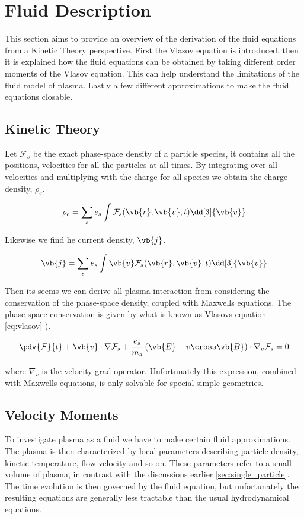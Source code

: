 \section{Fluid Description}
	This section aims to provide an overview of the derivation of the fluid equations
	from a Kinetic Theory perspective. First the Vlasov equation is introduced,
	then it is explained how the fluid equations can be obtained by taking different
	order moments of the Vlasov equation. This can help understand the limitations
	of the fluid model of plasma. Lastly a few different approximations
	to make the fluid equations closable.

\subsection{Kinetic Theory}
	Let \(\mathcal{F}_s\) be the exact phase-space density of a particle species,
	it contains all the positions, velocities for all the particles at
	all times. By integrating over all velocities and multiplying with the charge
	for all species we obtain the charge density, \(\rho_c\).

	\[\rho_c = \sum_s e_s \int \mathcal{F}_s(\vb{r},\vb{v},t)\dd[3]{\vb{v}}\]

	Likewise we find he current density, \(\vb{j}\).

	\[\vb{j} = \sum_s e_s \int \vb{v}\mathcal{F}_s(\vb{r},\vb{v},t)\dd[3]{\vb{v}}\]

	Then its seems we can derive all plasma interaction from considering
	the conservation of the phase-space density, coupled with Maxwells equations.
	The phase-space conservation is given by what is known as Vlasovs equation \cref{eq:vlasov}
	\citep{pecseli_waves_2012}).

	\begin{align}
		\pdv{\mathcal{F}}{t} + \vb{v}\cdot\nabla\mathcal{F}_s + \frac{e_s}{m_s}\left( \vb{E} + v\cross\vb{B} \right) \cdot \nabla_v\mathcal{F}_s = 0 \label{eq:vlasov}
	\end{align}

	where \(\nabla_v\) is the velocity grad-operator.
	Unfortunately this expression, combined with Maxwells equations, is only solvable
	for special simple geometries.

\subsection{Velocity Moments}
	To investigate plasma as a fluid we have to make certain fluid approximations.
	The plasma is then characterized by local parameters describing particle
	density, kinetic temperature, flow velocity and so on. These parameters refer
	to a small volume of plasma, in contrast with the discussions earlier \cref{sec:single_particle}.
	The time evolution is then governed by the fluid equation, but unfortunately the resulting
	equations are generally less tractable than the usual hydrodynamical
	equations.

